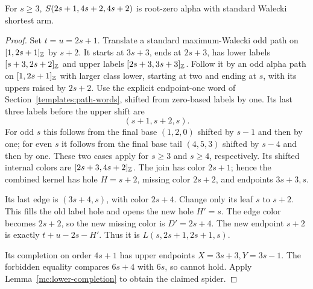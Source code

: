 \begin{lemma}\label{mc:oee-repeated-boundary}
For $s\ge3$, $S\!\left(2s+1,4s+2,4s+2\right)$ is root-zero alpha
with standard Walecki shortest arm.
\end{lemma}
\begin{proof}
Set $t=u=2s+1$.  Translate a standard maximum-Walecki odd path on
$[1,2s+1]_{\mathbb Z}$ by $s+2$.  It starts at $3s+3$, ends
at $2s+3$, has lower labels $[s+3,2s+2]_{\mathbb Z}$ and
upper labels $[2s+3,3s+3]_{\mathbb Z}$.
Follow it by an odd alpha path on $[1,2s+1]_{\mathbb Z}$ with
larger class lower, starting at two and ending at $s$, with its
uppers raised by $2s+2$.  Use the explicit endpoint-one word
of Section~\ref{templates:path-words}, shifted from zero-based
labels by one.  Its last three labels before the upper shift are
\[
 (s+1,s+2,s).
\]
For odd $s$ this follows from the final base $(1,2,0)$ shifted by
$s-1$ and then by one; for even $s$ it follows from the final
base tail $(4,5,3)$ shifted by $s-4$ and then by one.
These two cases apply for $s\ge3$ and $s\ge4$, respectively.
Its shifted internal colors are $[2s+3,4s+2]_{\mathbb Z}$.
The join has color $2s+1$; hence the combined kernel has hole
$H=s+2$, missing color $2s+2$, and endpoints $3s+3,s$.

Its last edge is $(3s+4,s)$, with color $2s+4$.
Change only its leaf $s$ to $s+2$.  This fills the old label hole
and opens the new hole $H'=s$.  The edge color becomes $2s+2$,
so the new missing color is $D'=2s+4$.
The new endpoint $s+2$ is exactly $t+u-2s-H'$.
Thus it is $L(s,2s+1,2s+1,s)$.

Its completion on order $4s+1$ has upper endpoints
$X=3s+3,Y=3s-1$.  The forbidden equality compares
$6s+4$ with $6s$, so cannot hold.  Apply
Lemma~\ref{mc:lower-completion} to obtain the claimed spider.
\end{proof}

